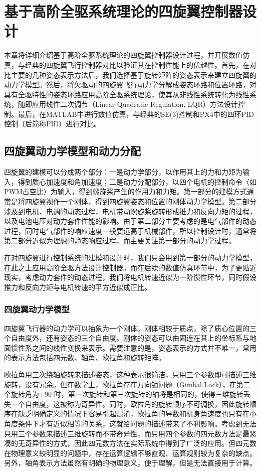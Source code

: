 \chapter{基于高阶全驱系统理论的四旋翼控制器设计}  
本章将详细介绍基于高阶全驱系统理论的四旋翼控制器设计过程，并开展数值仿真，与经典的四旋翼飞行控制器对比以验证其在控制性能上的优越性。首先，在对比主要的几种姿态表示方法后，我们选择基于旋转矩阵的姿态表示来建立四旋翼的动力学模型。然后，将欠驱动的四旋翼飞行动力学分解成姿态环路和位置环路，对具有全驱特性的姿态环路应用高阶全驱系统理论，使其从非线性系统转化为线性系统，随即应用线性二次调节（Linear-Quadratic Regulation, LQR）方法设计控制。最后，在MATLAB中进行数值仿真，与经典的SE(3)控制和PX4中的四环PID控制（后简称PID）进行对比。

\section{四旋翼动力学模型和动力分配}
四旋翼的建模可以分成两个部分：一是动力学部分，以作用其上的力和力矩为输入，得到质心加速度和角加速度；二是动力分配部分，以四个电机的控制命令（如PWM占空比）为输入，得到螺旋桨产生的作用力和力矩。第一部分的建模方式通常是将四旋翼视作一个刚体，得到四旋翼姿态和位置的刚体动力学模型。第二部分涉及到电机、电调的动态过程，电机带动螺旋桨旋转形成推力和反向力矩的过程，以及电池电压对动力套件性能的影响。由于第二部分主要考虑的是电气部件的动态过程，同时电气部件的响应速度一般要远高于机械部件，所以控制设计时，通常将第二部分近似为理想的静态响应过程，而主要关注第一部分的动力学过程。

在对四旋翼进行控制系统的建模和设计时，我们只会用到第一部分的动力学模型，在此之上应用高阶全驱方法设计控制器。而在后续的数值仿真环节中，为了更贴近现实，考虑动力套件的动态过程，我们将电机转速近似为一阶惯性环节，同时假设推力和反向力矩与电机转速的平方近似成正比\cite{Lee2010}。

\subsection*{四旋翼动力学模型}
四旋翼飞行器的动力学可以抽象为一个刚体。刚体相较于质点，除了质心位置的三个自由度外，还有姿态的三个自由度。刚体的姿态可以由固连在其上的坐标系与地面惯性系之间的线性变换来表示。需要注意的是，姿态表示的方式并不唯一，常用的表示方法包括四元数、轴角、欧拉角和旋转矩阵\cite{attitude}。


欧拉角用三次绕轴旋转来描述姿态，这种表示很简洁，只用三个参数即可描述三维旋转，没有冗余。但在数学上，欧拉角存在万向锁问题（Gimbal Lock），在第二个旋转角为$\pm 90^{\circ}$时，第一次旋转和第三次旋转的轴将是相同的，使得三维旋转丢失一个自由度，这被称为奇异性。同时，欧拉角的旋转顺序不可调换，因此旋转顺序在缺乏明确定义的情况下容易引起混淆，欧拉角的导数和机身角速度也只有在小角度条件下才有近似相等的关系，这就给问题的描述带来了不利影响。考虑到无法只用三个参数来描述三维旋转而不带奇异性，而只用四个参数的四元数方法是最紧凑的无奇异性的方式，因此四元数方法在实际系统中得到了广泛的应用。但四元数在物理意义较明显的问题中，存在运算逻辑不够直观、运算规则较为复杂的缺点。另外，轴角表示方法虽然有明确的物理意义，便于理解，但是无法直接用于计算。

